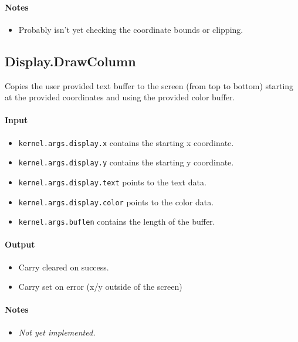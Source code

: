 \paragraph{Notes}
\begin{itemize}
\item Probably isn't yet checking the coordinate bounds or clipping.
\end{itemize}

\subsection*{Display.DrawColumn}
Copies the user provided text buffer to the screen (from top to bottom) starting at the provided coordinates and using the provided color buffer.

\paragraph{Input}
\begin{itemize}
\item \verb+kernel.args.display.x+ contains the starting x coordinate.
\item \verb+kernel.args.display.y+ contains the starting y coordinate.
\item \verb+kernel.args.display.text+ points to the text data.
\item \verb+kernel.args.display.color+ points to the color data.
\item \verb+kernel.args.buflen+ contains the length of the buffer.
\end{itemize}

\paragraph{Output}
\begin{itemize}
\item Carry cleared on success.
\item Carry set on error (x/y outside of the screen)
\end{itemize}

\paragraph{Notes}
\begin{itemize}
\item {\em Not yet implemented.}
\end{itemize}
